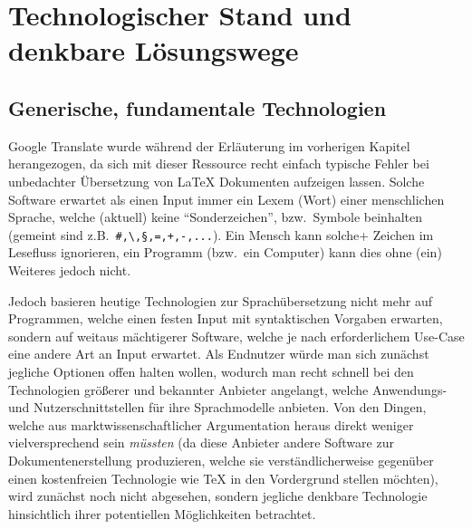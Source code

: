 
\section{Technologischer Stand und denkbare Lösungswege} %

\subsection{Generische, fundamentale Technologien} %
Google Translate wurde während der Erläuterung im vorherigen Kapitel herangezogen, da sich mit dieser Ressource recht einfach typische Fehler bei unbedachter Übersetzung von \LaTeX{} Dokumenten aufzeigen lassen. Solche Software erwartet als einen Input immer ein Lexem (Wort) einer menschlichen Sprache, welche (aktuell) keine \enquote{Sonderzeichen}, bzw.\ Symbole beinhalten (gemeint sind z.B.\ \verb|#,\,§,=,+,-,...|). Ein Mensch kann solche+ Zeichen im Lesefluss ignorieren, ein Programm (bzw.\ ein Computer) kann dies ohne (ein) Weiteres jedoch nicht.%

Jedoch basieren heutige Technologien zur Sprachübersetzung nicht mehr auf Programmen, welche einen festen Input mit syntaktischen Vorgaben erwarten, sondern auf weitaus mächtigerer Software, welche je nach erforderlichem Use-Case eine andere Art an Input erwartet. Als Endnutzer würde man sich zunächst jegliche Optionen offen halten wollen, wodurch man recht schnell bei den Technologien größerer und bekannter Anbieter angelangt, welche Anwendungs- und Nutzerschnittstellen für ihre Sprachmodelle anbieten. Von den Dingen, welche aus marktwissenschaftlicher Argumentation heraus direkt weniger vielversprechend sein \textit{müssten} (da diese Anbieter andere Software zur Dokumentenerstellung produzieren, welche sie verständlicherweise gegenüber einen kostenfreien Technologie wie \TeX{} in den Vordergrund stellen möchten), wird zunächst noch nicht abgesehen, sondern jegliche denkbare Technologie hinsichtlich ihrer potentiellen Möglichkeiten betrachtet. 

